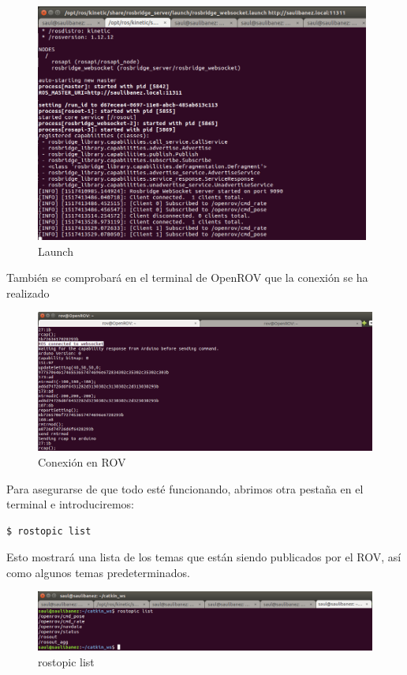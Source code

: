 \begin{figure} [hbtp]
  \begin{center}
    \includegraphics[width=11cm]{img/cap4/launch}
  \end{center}
  \caption{Launch}
  \label{fig:websocket.launch}
\end{figure}

También se comprobará en el terminal de OpenROV que la conexión se ha realizado

\begin{figure} [hbtp]
  \begin{center}
    \includegraphics[width=12cm]{img/cap4/conexion_ROV}
  \end{center}
  \caption{Conexión en ROV}
  \label{fig:conect_rov}
\end{figure}

Para asegurarse de que todo esté funcionando, abrimos otra pestaña en el terminal e introduciremos:
\begin{lstlisting}[caption=rostopic list, label={lst:list}]
	$ rostopic list
\end{lstlisting}

Esto mostrará una lista de los temas que están siendo publicados por el ROV, así como algunos temas predeterminados.

\begin{figure} [hbtp]
  \begin{center}
    \includegraphics[width=12cm]{img/cap4/rostopic_list}
  \end{center}
  \caption{rostopic list}
  \label{fig:rostopic_list}
\end{figure}

